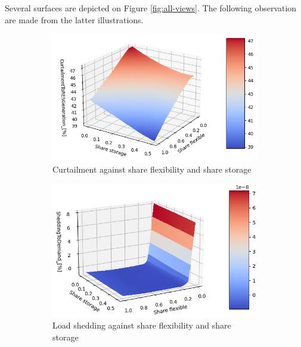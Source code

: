 Several surfaces are depicted on Figure \ref{fig:all-views}. The following observation are made from the latter illustrations.

\begin{figure}[h]
    \centering
    \begin{subfigure}[b]{0.49\textwidth}
        \includegraphics[width=\textwidth]{resources/images/view_1-2-0.png}
        \caption{Curtailment against share flexibility and share storage}
        \label{fig:surf-1-2-0}
    \end{subfigure}
    \hfill
    \begin{subfigure}[b]{0.49\textwidth}
        \includegraphics[width=\textwidth]{resources/images/view_1-2-1.png}
        \caption{Load shedding against share flexibility and share storage}
        \label{fig:surf-1-2-1}
    \end{subfigure}
    \hfill
    \begin{subfigure}[b]{0.49\textwidth}

\end{subfigure}
\end{figure}
